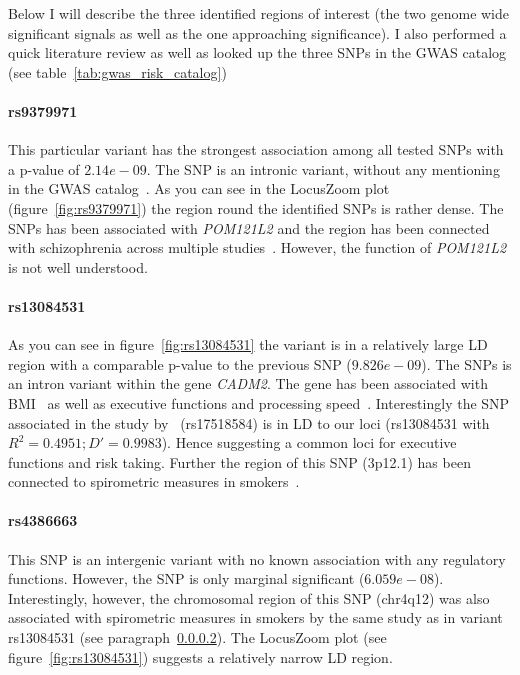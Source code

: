 Below I will describe the three identified regions of interest (the two genome wide significant signals as well as the one approaching significance).
I also performed a quick literature review as well as looked up the three SNPs in the GWAS catalog (see table~\ref{tab:gwas_risk_catalog})

\paragraph{rs9379971}
\label{par:rs9379971}
This particular variant has the strongest association among all tested SNPs with a p-value of $2.14e-09$. 
The SNP is an intronic variant, without any mentioning in the GWAS catalog~\cite{Welter2014}.
As you can see in the LocusZoom plot (figure~\ref{fig:rs9379971}) the region round the identified SNPs is rather dense. 
The SNPs has been associated with \textit{POM121L2} and the region has been connected with schizophrenia across multiple studies~\cite{Aberg2013,Shi2009}.
However, the function of \textit{POM121L2} is not well understood.

\paragraph{rs13084531}
\label{par:rs13084531}
As you can see in figure~\ref{fig:rs13084531} the variant is in a relatively large LD region with a comparable p-value to the previous SNP ($9.826e-09$).
The SNPs is an intron variant within the gene \textit{CADM2}.
The gene has been associated with BMI~\cite{Speliotes2010} as well as executive functions and processing speed~\cite{Ibrahim-Verbaas2015}.
Interestingly the SNP associated in the study by~\cite{Ibrahim-Verbaas2015} (rs17518584) is in LD to our loci (rs13084531 with $R^2=0.4951;D'=0.9983$).
Hence suggesting a common loci for executive functions and risk taking.
Further the region of this SNP (3p12.1) has been connected to spirometric measures in smokers~\cite{Lutz2015}.

\paragraph{rs4386663}
\label{par:rs4386663}
This SNP is an intergenic variant with no known association with any regulatory functions.
However, the SNP is only marginal significant ($6.059e-08$).
Interestingly, however, the chromosomal region of this SNP (chr4q12) was also associated with spirometric measures in smokers by the same study as in variant rs13084531 (see paragraph~\ref{par:rs13084531}).
The LocusZoom plot (see figure~\ref{fig:rs13084531}) suggests a relatively narrow LD region. 

